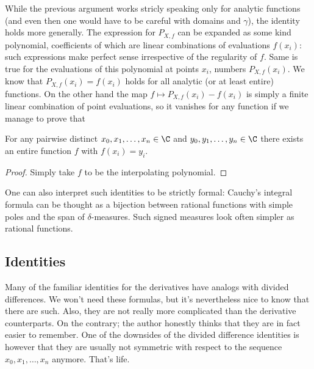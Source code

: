 While the previous argument works stricly speaking only for analytic functions (and even then one would have to be careful with domains and $\gamma$), the identity holds more generally. The expression for $P_{X, f}$ can be expanded as some kind polynomial, coefficients of which are linear combinations of evaluations $f(x_{i})$: such expressions make perfect sense irrespective of the regularity of $f$. Same is true for the evaluations of this polynomial at points $x_{i}$, numbers $P_{X, f}(x_{i})$. We know that $P_{X, f}(x_{i}) = f(x_{i})$ holds for all analytic (or at least entire) functions. On the other hand the map $f \mapsto P_{X, f}(x_{i}) - f(x_{i})$ is simply a finite linear combination of point evaluations, so it vanishes for any function if we manage to prove that

\begin{lem}\label{entire_interpolation}
	For any pairwise distinct $x_{0}, x_{1}, \ldots, x_{n} \in \C$ and $y_{0}, y_{1}, \ldots, y_{n} \in \C$ there exists an entire function $f$ with $f(x_{i}) = y_{i}$.
\end{lem}
\begin{proof}
	Simply take $f$ to be the interpolating polynomial.
\end{proof}

One can also interpret such identities to be strictly formal: Cauchy's integral formula can be thought as a bijection between rational functions with simple poles and the span of $\delta$-measures. Such signed measures look often simpler as rational functions.

\subsection{Identities}

Many of the familiar identities for the derivatives have analogs with divided differences. We won't need these formulas, but it's nevertheless nice to know that there are such. Also, they are not really more complicated than the derivative counterparts. On the contrary; the author honestly thinks that they are in fact easier to remember. One of the downsides of the divided difference identities is however that they are usually not symmetric with respect to the sequence $x_{0}, x_{1}, \ldots, x_{n}$ anymore. That's life.

